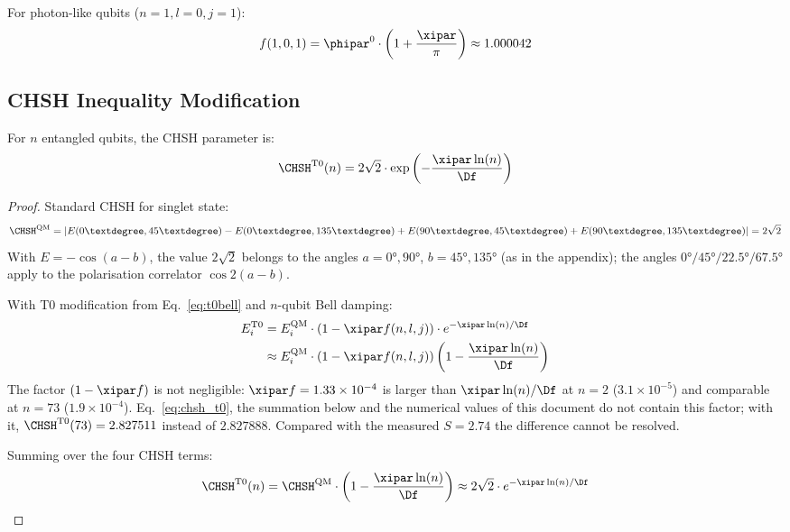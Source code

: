 For photon-like qubits ($n=1, l=0, j=1$):
\begin{equation}
	f(1,0,1) = \phipar^0 \cdot \left(1 + \frac{\xipar}{\pi}\right) \approx 1.000042
\end{equation}

\subsection{CHSH Inequality Modification}

\begin{proposition}
	For $n$ entangled qubits, the CHSH parameter is:
	\begin{equation}
		\CHSH^{\text{T0}}(n) = 2\sqrt{2} \cdot \exp\left(-\frac{\xipar \ln(n)}{\Df}\right)
		\label{eq:chsh_t0}
	\end{equation}
\end{proposition}

\begin{proof}
	Standard CHSH for singlet state:
	\begin{equation}
		\CHSH^{\text{QM}} = |E(0°, 45°) - E(0°, 135°) + E(90°, 45°) + E(90°, 135°)| = 2\sqrt{2}
	\end{equation}
	With $E = -\cos(a-b)$, the value $2\sqrt{2}$ belongs to the angles $a = 0°, 90°$, $b = 45°, 135°$ (as in the appendix); the angles $0°/45°/22.5°/67.5°$ apply to the polarisation correlator $\cos 2(a-b)$.
	
	With T0 modification from Eq.~\eqref{eq:t0bell} and $n$-qubit Bell damping:
	\begin{align}
		E^{\text{T0}}_i &= E^{\text{QM}}_i \cdot \left(1 - \xipar f(n,l,j)\right) \cdot e^{-\xipar\ln(n)/\Df} \\
		&\approx E^{\text{QM}}_i \cdot \left(1 - \xipar f(n,l,j)\right) \left(1 - \frac{\xipar \ln(n)}{\Df}\right)
	\end{align}
	The factor $(1 - \xipar f)$ is not negligible: $\xipar f = 1.33\times10^{-4}$ is larger than $\xipar\ln(n)/\Df$ at $n = 2$ ($3.1\times10^{-5}$) and comparable at $n = 73$ ($1.9\times10^{-4}$). Eq.~\eqref{eq:chsh_t0}, the summation below and the numerical values of this document do not contain this factor; with it, $\CHSH^{\text{T0}}(73) = 2.827511$ instead of $2.827888$. Compared with the measured $S = 2.74$ the difference cannot be resolved.
	
	Summing over the four CHSH terms:
	\begin{equation}
		\CHSH^{\text{T0}}(n) = \CHSH^{\text{QM}} \cdot \left(1 - \frac{\xipar \ln(n)}{\Df}\right) \approx 2\sqrt{2} \cdot e^{-\xipar\ln(n)/\Df}
	\end{equation}
\end{proof}

